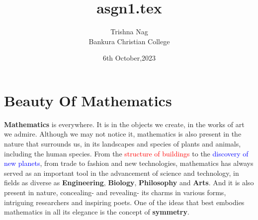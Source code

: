 \documentclass[12pt]{article}
\title{asgn1.tex}
\author{Trishna Nag \\ Bankura Christian College}
\date{6th October,2023}
\begin{document}
\maketitle

\section{Beauty Of Mathematics}
\textbf{Mathematics} is everywhere. It is in the objects we create, in the works of 
art we admire. Although we may not notice it, mathematics is also present 
in the nature that surrounds us, in its landscapes and species of plants and 
animals, including the human species. 
From the \textcolor{red}{ structure of buildings} to the \textcolor{blue}{discovery of new planets}, from trade to 
fashion and new technologies, mathematics has always served as an 
important tool in the advancement of science and technology, in fields as 
diverse as \textbf{ Engineering}, \textbf{Biology}, \textbf{Philosophy} and \textbf{Arts}. And it is also present 
in nature, concealing- and revealing- its charms in various forms, intriguing 
researchers and inspiring poets. One of the ideas that best embodies 
mathematics in all its elegance is the concept of \textbf{symmetry}.
\end{document}
